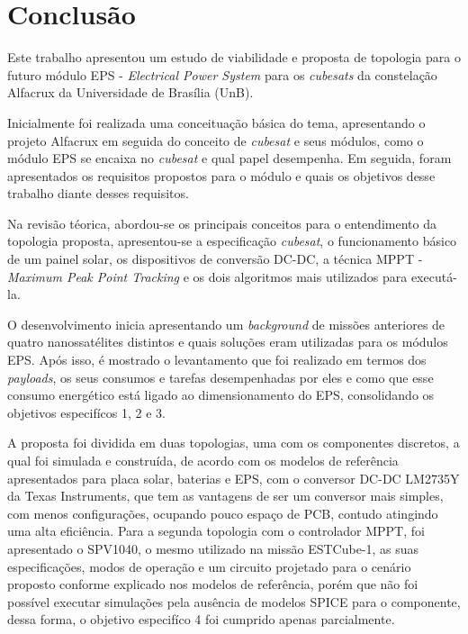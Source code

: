 \chapter{Conclusão} \label{conclusao}

Este trabalho apresentou um estudo de viabilidade e proposta de topologia para o futuro módulo EPS - \textit{Electrical Power System} para os \textit{cubesats} da constelação Alfacrux da Universidade de Brasília (UnB). 

Inicialmente foi realizada uma conceituação básica do tema, apresentando o projeto Alfacrux em seguida do conceito de \textit{cubesat} e seus módulos, como o módulo EPS se encaixa no \textit{cubesat} e qual papel desempenha. Em seguida, foram apresentados os requisitos propostos para o módulo e quais os objetivos desse trabalho diante desses requisitos.

Na revisão téorica, abordou-se os principais conceitos para o entendimento da topologia proposta, apresentou-se a especificação \textit{cubesat}, o funcionamento básico de um painel solar, os dispositivos de conversão DC-DC, a técnica MPPT - \textit{Maximum Peak Point Tracking} e os dois algoritmos mais utilizados para executá-la.

O desenvolvimento inicia apresentando um \textit{background} de missões anteriores de quatro nanossatélites distintos e quais soluções eram utilizadas para os módulos EPS. Após isso, é mostrado o levantamento que foi realizado em termos dos \textit{payloads}, os seus consumos e tarefas desempenhadas por eles e como que esse consumo energético está ligado ao dimensionamento do EPS, consolidando os objetivos especifícos 1, 2 e 3.

A proposta foi dividida em duas topologias, uma com os componentes discretos, a qual foi simulada e construída, de acordo com os modelos de referência apresentados para placa solar, baterias e EPS, com o conversor DC-DC LM2735Y da Texas Instruments, que tem as vantagens de ser um conversor mais simples, com menos configurações, ocupando pouco espaço de PCB, contudo atingindo uma alta eficiência. Para a segunda topologia com o controlador MPPT, foi apresentado o SPV1040, o mesmo utilizado na missão ESTCube-1, as suas especificações, modos de operação e um circuito projetado para o cenário proposto conforme explicado nos modelos de referência, porém que não foi possível executar simulações pela ausência de modelos SPICE para o componente, dessa forma, o objetivo especifíco 4 foi cumprido apenas parcialmente.

